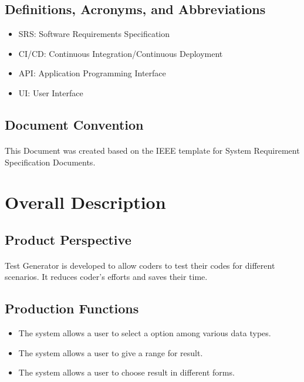 \documentclass{article}
\begin{document}
\subsection{Definitions, Acronyms, and Abbreviations}
\begin{itemize}
    \item SRS: Software Requirements Specification
    \item CI/CD: Continuous Integration/Continuous Deployment
    \item API: Application Programming Interface
    \item UI: User Interface
\end{itemize}

\subsection{Document Convention}
\paragraph{}
This Document was created based on the IEEE template for System Requirement
Specification Documents.


\section{Overall Description}
\subsection{Product Perspective}
\paragraph{}
Test Generator is developed to allow coders to test their codes for different scenarios.
It reduces coder's efforts and saves their time.

\subsection{Production Functions}
\begin{itemize}
    \item The system allows a user to select a option among various data types.
    \item The system allows a user to give a range for result.
    \item The system allows a user to choose result in different forms.
\end{itemize}
\end{document}
